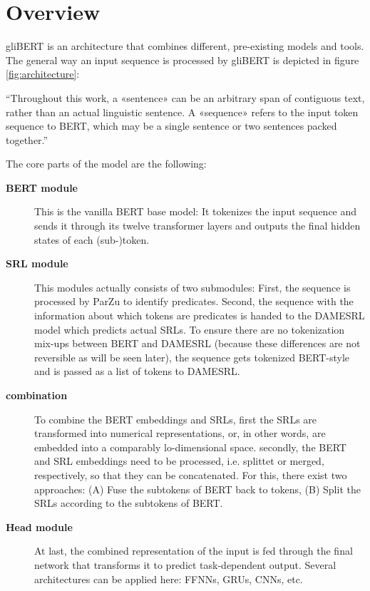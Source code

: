 
\label{chap:4_architecture}

\section{Overview}

gliBERT is an architecture that combines different, pre-existing models and tools.  The general
way an input sequence is processed by gliBERT is depicted in figure \ref{fig:architecture}:


``Throughout this work, a «sentence» can be an arbitrary span of contiguous text, rather
than an actual linguistic sentence. A «sequence» refers to the input token sequence to BERT,
which may be a single sentence or two sentences packed together.'' \citep{devlin2018bert}



The core parts of the model are the following:

\begin{description}
	\item[\textbf{BERT module}] This is the vanilla BERT base model: It tokenizes the input sequence and sends it through its twelve transformer layers and outputs the final hidden states of each (sub-)token.
  \item[\textbf{SRL module}] This modules actually consists of two submodules: First, the sequence is processed by ParZu to identify predicates.
	Second, the sequence with the information about which tokens are predicates is handed to the DAMESRL model which predicts actual SRLs.
	To ensure there are no tokenization mix-ups between BERT and DAMESRL (because these differences are not reversible as will be seen later), the sequence gets tokenized BERT-style and is passed as a list of tokens to DAMESRL.
  \item[\textbf{combination}] To combine the BERT embeddings and SRLs, first the SRLs are transformed into numerical representations, or, in other words, are embedded into a comparably lo-dimensional space.
	secondly, the BERT and SRL embeddings need to be processed, i.e. splittet or merged, respectively, so that they can be concatenated.
	For this, there exist two approaches:
	(A) Fuse the subtokens of BERT back to tokens, (B) Split the SRLs according to the subtokens of BERT.
  \item[\textbf{Head module}] At last, the combined representation of the input is fed through the final network that transforms it to predict task-dependent output. Several architectures can be applied here: FFNNs, GRUs, CNNs, etc.
\end{description}

